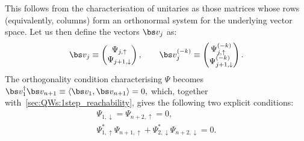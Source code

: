 This follows from the characterisation of unitaries as those matrices whose rows (equivalently, columns) form an orthonormal system for the underlying vector space.
Let us then define the vectors $\bs v_j$ as:
\begin{equation}
    \bs v_j \equiv \begin{pmatrix}
        \Psi_{j,\uparrow} \\ \Psi_{j+1,\downarrow}
    \end{pmatrix},
    \qquad
    \bs v_j^{(-k)} \equiv \begin{pmatrix}
        \Psi^{(-k)}_{j,\uparrow} \\ \Psi^{(-k)}_{j+1,\downarrow}
    \end{pmatrix}.
\end{equation}
The orthogonality condition characterising $\Psi$ becomes
$
    \bs v_1^\dagger \bs v_{n+1} \equiv \langle \bs v_1, \bs v_{n+1}\rangle = 0,
$
which, together with~\cref{sec:QWs:1step_reachability}, gives the following two explicit conditions:
\begin{subequations}
    \label{eq:QWs:both_2ndstep_conditions}
    \begin{align}
        \Psi_{1,\downarrow} = \Psi_{n+2,\uparrow} = 0,
 		\label{eq:QWs:vanishing_endpoints_after_2steps}\\
        \Psi_{1,\uparrow}^* \Psi_{n+1,\uparrow} + 
        \Psi_{2,\downarrow}^* \Psi_{n+2,\downarrow} = 0.
 		\label{eq:QWs:1st_orthogonality_condition}
    \end{align}
\end{subequations}

